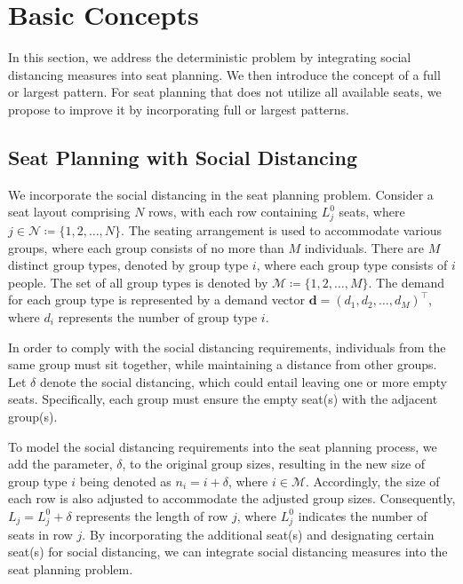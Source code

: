 \section{Basic Concepts}
In this section, we address the deterministic problem by integrating social distancing measures into seat planning. We then introduce the concept of a full or largest pattern. For seat planning that does not utilize all available seats, we propose to improve it by incorporating full or largest patterns.

\subsection{Seat Planning with Social Distancing}
We incorporate the social distancing in the seat planning problem. Consider a seat layout comprising $N$ rows, with each row containing $L_j^0$ seats, where $j \in \mathcal{N} \coloneqq \{1,2, \ldots, N\}$. The seating arrangement is used to accommodate various groups, where each group consists of no more than $M$ individuals. There are $M$ distinct group types, denoted by group type $i$, where each group type consists of $i$ people. The set of all group types is denoted by $\mathcal{M} \coloneqq \{1, 2, \ldots, M\}$. The demand for each group type is represented by a demand vector $\mathbf{d} = (d_1, d_2, \ldots, d_M)^{\intercal}$, where $d_i$ represents the number of group type $i$.


In order to comply with the social distancing requirements, individuals from the same group must sit together, while maintaining a distance from other groups. Let $\delta$ denote the social distancing, which could entail leaving one or more empty seats. Specifically, each group must ensure the empty seat(s) with the adjacent group(s).

To model the social distancing requirements into the seat planning process, we add the parameter, $\delta$, to the original group sizes, resulting in the new size of group type $i$ being denoted as $n_i = i + \delta$, where $i \in \mathcal{M}$. Accordingly, the size of each row is also adjusted to accommodate the adjusted group sizes. Consequently, $L_j = L_j^{0} + \delta$ represents the length of row $j$, where $L_j^{0}$ indicates the number of seats in row $j$. By incorporating the additional seat(s) and designating certain seat(s) for social distancing, we can integrate social distancing measures into the seat planning problem.


